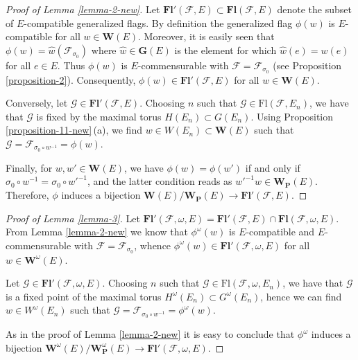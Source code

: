 \documentclass[12pt]{amsart}
\theoremstyle{definition}
\begin{document}
\begin{proof}[Proof of Lemma \ref{lemma-2-new}]
Let $\mathbf{Fl}'(\mathcal{F},E)\subset\mathbf{Fl}(\mathcal{F},E)$ denote the subset of $E$-compatible generalized flags.
By definition the generalized flag $\phi(w)$ is $E$-compatible for all $w\in\mathbf{W}(E)$. Moreover, it is easily seen that $\phi(w)=\hat{w}(\mathcal{F}_{\sigma_0})$ where $\hat{w}\in\mathbf{G}(E)$ is the element for which $\hat{w}(e)=w(e)$ for all $e\in E$. Thus $\phi(w)$ is $E$-commensurable with $\mathcal{F}=\mathcal{F}_{\sigma_0}$ (see Proposition \ref{proposition-2}). Consequently, $\phi(w)\in\mathbf{Fl}'(\mathcal{F},E)$ for all $w\in\mathbf{W}(E)$.

Conversely, let $\mathcal{G}\in\mathbf{Fl}'(\mathcal{F},E)$. Choosing $n$ such that $\mathcal{G}\in\mathrm{Fl}(\mathcal{F},E_n)$, we have that $\mathcal{G}$ is fixed by the maximal torus $H(E_n)\subset G(E_n)$. Using Proposition \ref{proposition-11-new}\,{\rm (a)}, we
find $w\in W(E_n)\subset\mathbf{W}(E)$ such that $\mathcal{G}=\mathcal{F}_{\sigma_0\circ w^{-1}}=\phi(w)$.

Finally, for $w,w'\in\mathbf{W}(E)$, we have $\phi(w)=\phi(w')$ if and only if $\sigma_0\circ w^{-1}=\sigma_0\circ w'^{-1}$, and the latter condition reads as $w'^{-1}w\in\mathbf{W}_\mathbf{P}(E)$. Therefore, $\phi$ induces a bijection $\mathbf{W}(E)/\mathbf{W}_\mathbf{P}(E)\to\mathbf{Fl}'(\mathcal{F},E)$.
\end{proof}

\begin{proof}[Proof of Lemma \ref{lemma-3}]
Let $\mathbf{Fl}'(\mathcal{F},\omega,E)=\mathbf{Fl}'(\mathcal{F},E)\cap \mathbf{Fl}(\mathcal{F},\omega,E)$.
From Lemma \ref{lemma-2-new} we know that $\phi^\omega(w)$ is $E$-compatible and $E$-commensurable with $\mathcal{F}=\mathcal{F}_{\sigma_0}$, whence $\phi^\omega(w)\in\mathbf{Fl}'(\mathcal{F},\omega,E)$ for all $w\in\mathbf{W}^\omega(E)$.

Let $\mathcal{G}\in\mathbf{Fl}'(\mathcal{F},\omega,E)$. Choosing $n$ such that $\mathcal{G}\in \mathrm{Fl}(\mathcal{F},\omega,E_n)$, we have that $\mathcal{G}$ is a fixed point of the maximal torus $H^\omega(E_n)\subset G^\omega(E_n)$, hence we can find $w\in W^\omega(E_n)$ such that $\mathcal{G}=\mathcal{F}_{\sigma_0\circ w^{-1}}=\phi^\omega(w)$.

As in the proof of Lemma \ref{lemma-2-new} it is easy to conclude that $\phi^\omega$ induces a bijection $\mathbf{W}^\omega(E)/\mathbf{W}_\mathbf{P}^\omega(E)\to\mathbf{Fl}'(\mathcal{F},\omega,E)$.
\end{proof}
\end{document}
